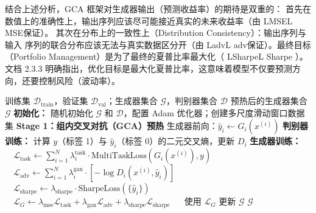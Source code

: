 结合上述分析，GCA 框架对生成器输出（预测收益率）的期待是双重的：
首先在数值上的准确性上，输出序列应该尽可能接近真实的未来收益率（由 LMSEL MSE保证）。
其次在分布上的一致性上（Distribution Consistency）：输出序列与输入 序列的联合分布应该无法与真实数据区分开（由 LadvL adv保证）。最终目标（Portfolio Management）是为了最终的夏普比率最大化（ LSharpeL Sharpe ）。文档 2.3.3 明确指出，优化目标是最大化夏普比率，这意味着模型不仅要预测方向，还要控制风险（波动率）。

\begin{algorithm}[H]
\caption{GCA 框架初始化与预热}
\label{alg:MGCA_init}
\begin{algorithmic}[0]
\Require 训练集 $\mathcal{D}_{\text{train}}$，验证集 $\mathcal{D}_{\text{val}}$；生成器集合 $\mathcal{G}$，判别器集合 $\mathcal{D}$
\Ensure 预热后的生成器集合 $\mathcal{G}$
\Statex
\State \textbf{初始化：} 随机初始化 $\mathcal{G}$ 和 $\mathcal{D}$，配置 Adam 优化器；创建多尺度滑动窗口数据集
\Statex
\State \textbf{Stage 1：组内交叉对抗（GCA）预热}
        \State 生成器前向：$\hat{y}_i \leftarrow G_i(x^{(i)})$
        \State \textbf{判别器训练：} 计算 $y$（标签 1）与 $\hat{y}_i$（标签 0）的二元交叉熵，更新 $D_i$
        \State \textbf{生成器训练：}
        \State $\quad \mathcal{L}_{\text{task}} \leftarrow \sum_{i=1}^N \lambda_i^{\text{task}} \cdot \text{MultiTaskLoss}(G_i(x^{(i)}), y)$
        \State $\quad \mathcal{L}_{\text{adv}} \leftarrow \sum_{i=1}^N \lambda_i^{\text{gan}} \cdot \left[-\log D_i(x^{(i)}, \hat{y}_i)\right]$
        \State $\quad \mathcal{L}_{\text{sharpe}} \leftarrow \lambda_{\text{sharpe}} \cdot \text{SharpeLoss}(\{\hat{y}_i\})$
        \State $\quad \mathcal{L}_G \leftarrow \lambda_{\text{mse}}\mathcal{L}_{\text{task}} + \lambda_{\text{gan}}\mathcal{L}_{\text{adv}} + \lambda_{\text{sharpe}}\mathcal{L}_{\text{sharpe}}$
        \State $\quad$ 使用 $\mathcal{L}_G$ 更新 $\mathcal{G}$
    \EndFor
\EndFor
\State \Return $\mathcal{G}$
\end{algorithmic}
\end{algorithm}

